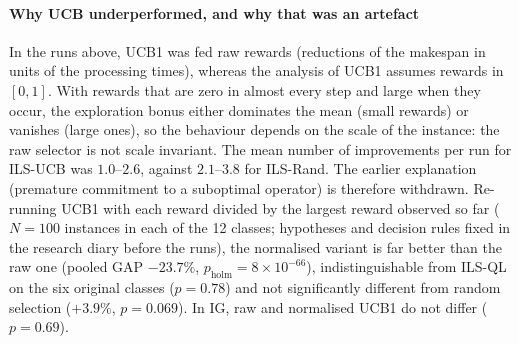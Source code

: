 \documentclass[final,3p,times,11pt,authoryear]{elsarticle}
\begin{document}
\paragraph{Why UCB underperformed, and why that was an artefact}
In the runs above, UCB1 was fed raw rewards (reductions of the makespan
in units of the processing times), whereas the analysis of UCB1
assumes rewards in $[0,1]$. With rewards that are zero in almost every
step and large when they occur, the exploration bonus either dominates
the mean (small rewards) or vanishes (large ones), so the behaviour
depends on the scale of the instance: the raw selector is not scale
invariant. The mean number of improvements per run for ILS-UCB was
$1.0$--$2.6$, against $2.1$--$3.8$ for ILS-Rand. The earlier
explanation (premature commitment to a suboptimal operator) is
therefore withdrawn. Re-running UCB1 with each reward divided by the
largest reward observed so far ($N=100$ instances in each of the 12
classes; hypotheses and decision rules fixed in the research diary before
the runs), the normalised variant is far better than the raw one (pooled
GAP $-23.7\%$, $p_{\mathrm{holm}}=8\times10^{-66}$), indistinguishable
from ILS-QL on the six original classes ($p=0.78$) and not significantly
different from random selection ($+3.9\%$, $p=0.069$). In IG, raw and
normalised UCB1 do not differ ($p=0.69$).
\end{document}

